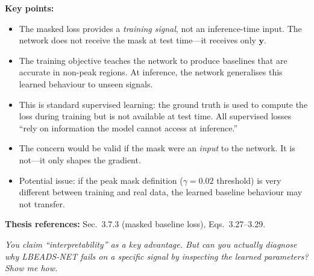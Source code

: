 \documentclass[11pt, letterpaper]{article}
\newcounter{qcounter}
\newcommand{\question}[1]{%
  \stepcounter{qcounter}%
  \begin{questionbox}[Q\theqcounter]%
    \itshape #1%
  \end{questionbox}%
}
\begin{document}
\begin{answerbox}
\textbf{Key points:}
\begin{itemize}[nosep]
  \item The masked loss provides a \emph{training signal}, not
        an inference-time input.  The network does not receive the
        mask at test time---it receives only $\mathbf{y}$.
  \item The training objective teaches the network to produce
        baselines that are accurate in non-peak regions.  At inference,
        the network generalises this learned behaviour to unseen signals.
  \item This is standard supervised learning: the ground truth is used
        to compute the loss during training but is not available at
        test time.  All supervised losses ``rely on information the
        model cannot access at inference.''
  \item The concern would be valid if the mask were an \emph{input}
        to the network.  It is not---it only shapes the gradient.
  \item Potential issue: if the peak mask definition ($\gamma = 0.02$
        threshold) is very different between training and real data,
        the learned baseline behaviour may not transfer.
\end{itemize}
\textbf{Thesis references:} Sec.~3.7.3 (masked baseline loss), Eqs.~3.27--3.29.
\end{answerbox}

\question{You claim ``interpretability'' as a key advantage.  But can you
actually \emph{diagnose} why LBEADS-NET fails on a specific signal
by inspecting the learned parameters?  Show me how.}
\end{document}
